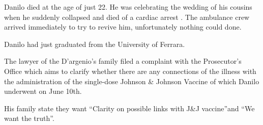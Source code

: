 Danilo died at the age of just 22. He was celebrating the wedding of his cousins
when he suddenly collapsed and died of a cardiac arrest . The ambulance crew
arrived immediately to try to revive him, unfortunately nothing could done.

Danilo had just graduated from the University of Ferrara.

The lawyer of the D'argenio’s family filed a complaint with the Prosecutor’s
Office which aims to clarify whether there are any connections of the illness
with the administration of the single-dose Johnson \& Johnson Vaccine of which
Danilo underwent on June 10th.

His family state they want “Clarity on possible links with J\&J vaccine”and “We
want the truth”.


